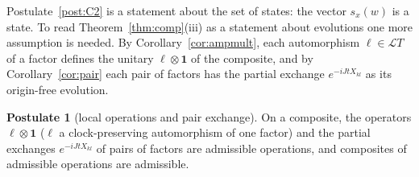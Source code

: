 \documentclass[aps,pra,onecolumn,superscriptaddress,nofootinbib,10pt]{revtex4-2}
\theoremstyle{definition}
\newtheorem{postulate}{Postulate}
\theoremstyle{remark}
\newcommand{\cL}{\mathcal{L}}
\begin{document}
Postulate~\ref{post:C2} is a statement about the set of states: the vector $s_x(w)$ is a state.  To
read Theorem~\ref{thm:comp}(iii) as a statement about evolutions one more assumption is needed.  By
Corollary~\ref{cor:ampmult}, each automorphism $\ell\in\cL T$ of a factor defines the unitary
$\ell\otimes\mathbf1$ of the composite, and by Corollary~\ref{cor:pair} each pair of factors has the
partial exchange $e^{-iJtX_{kl}}$ as its origin-free evolution.

\begin{postulate}[local operations and pair exchange]\label{post:C3}
On a composite, the operators $\ell\otimes\mathbf1$ ($\ell$ a clock-preserving automorphism of one factor)
and the partial exchanges $e^{-iJtX_{kl}}$ of pairs of factors are admissible operations, and
composites of admissible operations are admissible.
\end{postulate}
\end{document}
